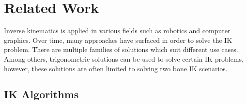 \chapter{Related Work}
Inverse kinematics is applied in various fields such as robotics and computer
graphics. Over time, many approaches have surfaced in order to solve the IK
problem. There are multiple families of solutions \cite{Aristidou2011} which
suit different use cases. Among others, trigonometric solutions can be used to
solve certain IK problems, however, these solutions are often limited to solving
two bone IK scenarios. 

\section{IK Algorithms}
